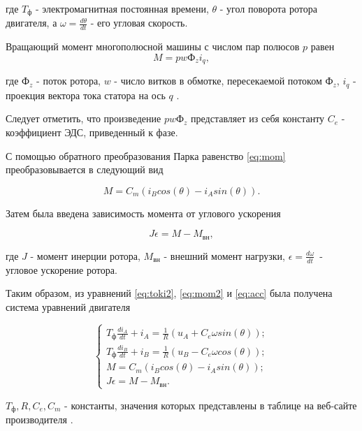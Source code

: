 где $T_{\text{ф}}$ - электромагнитная постоянная времени, $\theta$ - угол
поворота ротора двигателя, а $\omega=\frac{d\theta}{dt}$ - его угловая скорость.

Вращающий момент многополюсной машины с числом пар полюсов $p$ равен
\begin{equation}
  M=pw\text{Ф}_zi_q,
  \label{eq:mom}
\end{equation}

где $\text{Ф}_z$ - поток ротора, $w$ - число витков в обмотке, пересекаемой 
потоком $\text{Ф}_z$, $i_q$ - проекция вектора тока статора на 
ось $q$ \cite{БеленькийМикеровМоментныйПривод}.

Следует отметить, что произведение $pw\text{Ф}_z$ представляет из себя константу $C_e$ - 
коэффициент ЭДС, приведенный к фазе.

С помощью обратного преобразования Парка равенство \ref{eq:mom} преобразовывается в
следующий вид

\begin{equation}
  M=C_m(i_Bcos(\theta)-i_Asin(\theta)).
  \label{eq:mom2}
\end{equation}

Затем была введена зависимость момента от углового ускорения

\begin{equation}
  J\epsilon=M - M_{\text{вн}},
  \label{eq:acc}
\end{equation}

где $J$ - момент инерции ротора, $M_{\text{вн}}$ - внешний момент нагрузки, $\epsilon=\frac{d\omega}{dt}$~- угловое ускорение ротора.

Таким образом, из уравнений \ref{eq:toki2}, \ref{eq:mom2} и \ref{eq:acc} 
была получена система уравнений двигателя 

\begin{equation}
  \begin{cases}
    T_{\text{ф}}\frac{di_A}{dt}+i_A=\frac{1}{R}(u_A+C_e\omega sin(\theta));
    \\
    T_{\text{ф}}\frac{di_B}{dt}+i_B=\frac{1}{R}(u_B-C_e\omega cos(\theta));
    \\
    M=C_m(i_Bcos(\theta)-i_Asin(\theta));
    \\
    J\epsilon=M - M_{\text{вн}}.
  \end{cases}
  \label{eq:sys}
\end{equation}

$T_{\text{ф}}, R, C_e, C_m$ - константы, значения которых представлены в таблице на 
веб-сайте производителя \cite{ДБМ63}.


